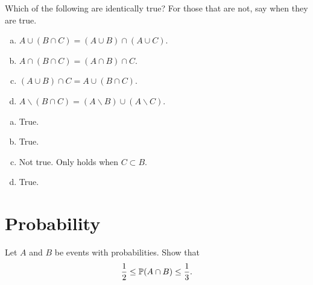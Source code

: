 \begin{problem}
	Which of the following are identically true? For those that are not, say when they are true.
	\begin{enumerate}[(a)]
		\item $ A\cup(B\cap C) = (A\cup B) \cap (A\cup C) $.
		\item $ A\cap (B\cap C) = (A\cap B) \cap C $.
		\item $ (A\cup B)\cap C = A\cup (B\cap C) $.
		\item $ A\backslash (B\cap C) = (A\backslash B)\cup (A\backslash C) $.
	\end{enumerate}
\end{problem}
\begin{solution}
	\begin{enumerate}[(a)]
		\item True.
		\item True.
		\item Not true. Only holds when $ C\subset B $.
		\item True.  
	\end{enumerate}
\end{solution}

\section{Probability}
\begin{problem}
	Let $ A $ and $ B $ be events with probabilities. Show that 
	\[ \frac{1}{2} \leq \mathbb{P}(A\cap B) \leq \frac{1}{3}. \]
\end{problem}
